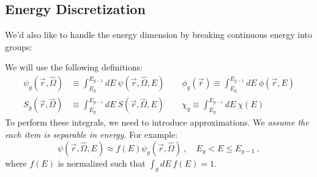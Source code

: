 \documentclass[12pt]{article}
\newcommand{\rvec}{\ensuremath{\vec{r}}}
\newcommand{\vOmega}{\ensuremath{\hat{\Omega}}}
\begin{document}
\subsection*{Energy Discretization}
We'd also like to handle the energy dimension by breaking continuous energy into groups:
\begin{center}
\end{center}
%
We will use the following definitions:
\begin{align*}
\psi_g(\rvec, \vOmega) &\equiv \int_{E_g}^{E_{g-1}} dE\: \psi(\rvec, \vOmega, E) \qquad
\phi_g(\rvec) \equiv \int_{E_g}^{E_{g-1}} dE\: \phi(\rvec,  E)\\
S_g(\rvec, \vOmega) &\equiv \int_{E_g}^{E_{g-1}} dE\: S(\rvec, \vOmega, E) \qquad
\chi_g \equiv \int_{E_g}^{E_{g-1}} dE\: \chi(E)
\end{align*}
%
To perform these integrals, we need to introduce approximations. We \textit{assume the each item is separable in energy}. For example:
\[
\psi(\vec{r}, \vOmega, E) \approx f(E)\psi_g(\vec{r}, \vOmega)\:, \quad E_g < E \leq E_{g-1}\:,
\]
where $f(E)$ is normalized such that $\int_g dE\: f(E) = 1$.
\end{document}
